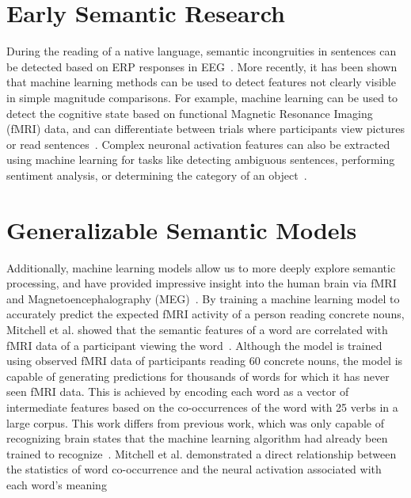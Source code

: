 \label{chapter:relatedwork}

\section{Early Semantic Research}

During the reading of a native language, semantic incongruities in sentences 
can be detected based on ERP responses in 
EEG~\cite{kutas1980reading,kuperberg2007neural}. More recently, it has been 
shown that machine learning methods can be used to detect features not clearly 
visible in simple magnitude comparisons. For example, machine learning can be 
used to detect the cognitive state based on functional Magnetic Resonance 
Imaging (fMRI)  data, and can differentiate between trials where participants  
view pictures or read sentences~\cite{Wang2002}. Complex neuronal activation 
features can also be extracted using machine learning for tasks like detecting 
ambiguous sentences, performing sentiment analysis, or determining the category 
of an object~\cite{Mitchell2002,Shinkareva2008,Gu2014}.

\section{Generalizable Semantic Models}

Additionally, machine learning models allow us to more deeply explore semantic 
processing, and have provided impressive insight into the human brain via fMRI 
and Magnetoencephalography (MEG)~\cite{Mitchell2008, Sudre2012}. By training a 
machine learning model to accurately predict the expected fMRI activity of a 
person reading concrete nouns, Mitchell et al. showed that the semantic 
features of a word are correlated with fMRI data of a participant viewing the 
word~\cite{Mitchell2008}. Although the model is trained using observed fMRI 
data of participants reading 60 concrete nouns, the model is capable of 
generating predictions for thousands of words for which it has never seen fMRI 
data. This is achieved by encoding each word as a vector of intermediate 
features based on the co-occurrences of the word with 25 verbs in a  large 
corpus.  This work differs from previous work, which was only capable of 
recognizing brain states that the machine learning algorithm had already been 
trained to 
recognize~\cite{kutas1980reading,kuperberg2007neural,Wang2002,Mitchell2002,Shinkareva2008,Gu2014}. 
Mitchell et al. demonstrated a direct relationship between the statistics of 
word co-occurrence and the neural activation associated with each word's 
meaning~\cite{Mitchell2008}

